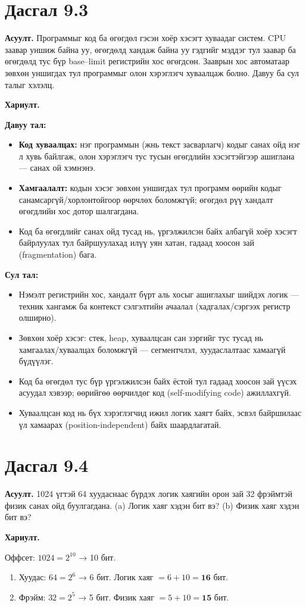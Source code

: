 \documentclass[12pt,a4paper]{article}
\newcommand{\question}[2]{\section{Дасгал #1}\textbf{Асуулт.} #2\par\medskip\textbf{Хариулт.}\par}
\begin{document}
\question{9.3}{Программыг код ба өгөгдөл гэсэн хоёр хэсэгт хуваадаг систем. CPU заавар уншиж байна уу, өгөгдөлд хандаж байна уу гэдгийг мэддэг тул заавар ба өгөгдөлд тус бүр base–limit регистрийн хос өгөгдсөн. Зааврын хос автоматаар зөвхөн уншигдах тул программыг олон хэрэглэгч хуваалцаж болно. Давуу ба сул талыг хэлэлц.}

\textbf{Давуу тал:}
\begin{itemize}[leftmargin=1.5em]
  \item \textbf{Код хуваалцах:} нэг программын (жнь текст засварлагч) кодыг санах ойд нэг л хувь байлгаж, олон хэрэглэгч тус тусын өгөгдлийн хэсэгтэйгээр ашиглана — санах ой хэмнэнэ.
  \item \textbf{Хамгаалалт:} кодын хэсэг зөвхөн уншигдах тул программ өөрийн кодыг санамсаргүй/хорлонтойгоор өөрчлөх боломжгүй; өгөгдөл рүү хандалт өгөгдлийн хос дотор шалгагдана.
  \item Код ба өгөгдлийг санах ойд тусад нь, үргэлжилсэн байх албагүй хоёр хэсэгт байрлуулах тул байршуулахад илүү уян хатан, гадаад хоосон зай (fragmentation) бага.
\end{itemize}

\textbf{Сул тал:}
\begin{itemize}[leftmargin=1.5em]
  \item Нэмэлт регистрийн хос, хандалт бүрт аль хосыг ашиглахыг шийдэх логик — техник хангамж ба контекст сэлгэлтийн ачаалал (хадгалах/сэргээх регистр олширно).
  \item Зөвхөн хоёр хэсэг: стек, heap, хуваалцсан сан зэргийг тус тусад нь хамгаалах/хуваалцах боломжгүй — сегментчлэл, хуудаслалтаас хамаагүй бүдүүлэг.
  \item Код ба өгөгдөл тус бүр үргэлжилсэн байх ёстой тул гадаад хоосон зай үүсэх асуудал хэвээр; өөрийгөө өөрчилдөг код (self-modifying code) ажиллахгүй.
  \item Хуваалцсан код нь бүх хэрэглэгчид ижил логик хаягт байх, эсвэл байршилаас үл хамаарах (position-independent) байх шаардлагатай.
\end{itemize}

\question{9.4}{1024 үгтэй 64 хуудаснаас бүрдэх логик хаягийн орон зай 32 фрэймтэй физик санах ойд буулгагдана. (a) Логик хаяг хэдэн бит вэ? (b) Физик хаяг хэдэн бит вэ?}

Оффсет: $1024 = 2^{10}$ → 10 бит.
\begin{enumerate}[label=(\alph*), leftmargin=1.5em]
  \item Хуудас: $64 = 2^6$ → 6 бит. Логик хаяг $= 6 + 10 = \mathbf{16}$ бит.
  \item Фрэйм: $32 = 2^5$ → 5 бит. Физик хаяг $= 5 + 10 = \mathbf{15}$ бит.
\end{enumerate}
\end{document}
